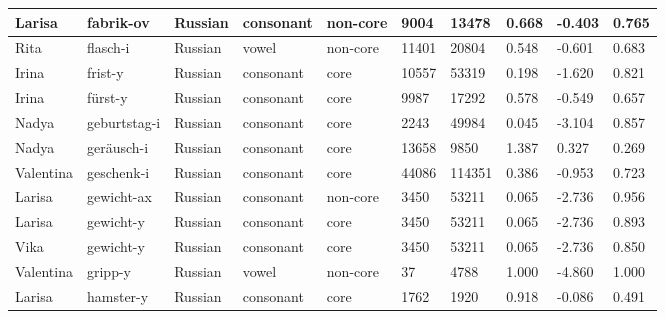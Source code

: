 \begin{longtable}{|p{1.2cm}|p{3cm}|p{1cm}|p{1.5cm}|p{1.5cm}|R{1.2cm}|R{1cm}|R{1cm}|R{0.8cm}|R{0.8cm}|}
Larisa    & fabrik-ov              & Russian       & consonant        & non-core  & 9004         & 13478          & 0.668                 & -0.403            & 0.765        \\ \hline
Rita      & flasch-i               & Russian       & vowel            & non-core  & 11401        & 20804          & 0.548                 & -0.601            & 0.683        \\ \hline
Irina     & frist-y                & Russian       & consonant        & core      & 10557        & 53319          & 0.198                 & -1.620            & 0.821        \\ \hline
Irina     & f\"{u}rst-y            & Russian       & consonant        & core      & 9987         & 17292          & 0.578                 & -0.549            & 0.657        \\ \hline
Nadya     & geburtstag-i           & Russian       & consonant        & core      & 2243         & 49984          & 0.045                 & -3.104            & 0.857        \\ \hline
Nadya     & ger\"{a}usch-i         & Russian       & consonant        & core      & 13658        & 9850           & 1.387                 & 0.327             & 0.269        \\ \hline
Valentina & geschenk-i             & Russian       & consonant        & core      & 44086        & 114351         & 0.386                 & -0.953            & 0.723        \\ \hline
Larisa    & gewicht-ax             & Russian       & consonant        & non-core  & 3450         & 53211          & 0.065                 & -2.736            & 0.956        \\ \hline
Larisa    & gewicht-y              & Russian       & consonant        & core      & 3450         & 53211          & 0.065                 & -2.736            & 0.893        \\ \hline
Vika      & gewicht-y              & Russian       & consonant        & core      & 3450         & 53211          & 0.065                 & -2.736            & 0.850        \\ \hline
Valentina & gripp-y                & Russian       & vowel            & non-core  & 37           & 4788           & 1.000                 & -4.860            & 1.000        \\ \hline
Larisa    & hamster-y              & Russian       & consonant        & core      & 1762         & 1920           & 0.918                 & -0.086            & 0.491        \\ \hline

\end{longtable}
